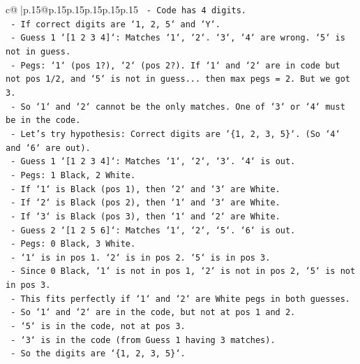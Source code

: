 \documentclass{article}
\begin{document}
{\begin{supertabular}{c@{$\;$}|p{.15\linewidth}@{}p{.15\linewidth}p{.15\linewidth}p{.15\linewidth}p{.15\linewidth}p{.15\linewidth}}
{{{\texttt{                    {-} Code has 4 digits.} \\
\texttt{                    {-} If correct digits are `1, 2, 5` and `Y`.} \\
\texttt{                    {-} Guess 1 `{[}1 2 3 4{]}`: Matches `1`, `2`. `3`, `4` are wrong. `5` is not in guess.} \\
\texttt{                    {-} Pegs: `1` (pos 1?), `2` (pos 2?). If `1` and `2` are in code but not pos 1/2, and `5` is not in guess... then max pegs = 2. But we got 3.} \\
\texttt{                    {-} So `1` and `2` cannot be the only matches. One of `3` or `4` must be in the code.} \\
\texttt{            {-} Let's try hypothesis: Correct digits are `\{1, 2, 3, 5\}`. (So `4` and `6` are out).} \\
\texttt{                {-} Guess 1 `{[}1 2 3 4{]}`: Matches `1`, `2`, `3`. `4` is out.} \\
\texttt{                    {-} Pegs: 1 Black, 2 White.} \\
\texttt{                    {-} If `1` is Black (pos 1), then `2` and `3` are White.} \\
\texttt{                    {-} If `2` is Black (pos 2), then `1` and `3` are White.} \\
\texttt{                    {-} If `3` is Black (pos 3), then `1` and `2` are White.} \\
\texttt{                {-} Guess 2 `{[}1 2 5 6{]}`: Matches `1`, `2`, `5`. `6` is out.} \\
\texttt{                    {-} Pegs: 0 Black, 3 White.} \\
\texttt{                    {-} `1` is in pos 1. `2` is in pos 2. `5` is in pos 3.} \\
\texttt{                    {-} Since 0 Black, `1` is not in pos 1, `2` is not in pos 2, `5` is not in pos 3.} \\
\texttt{                    {-} This fits perfectly if `1` and `2` are White pegs in both guesses.} \\
\texttt{                    {-} So `1` and `2` are in the code, but not at pos 1 and 2.} \\
\texttt{                    {-} `5` is in the code, not at pos 3.} \\
\texttt{                    {-} `3` is in the code (from Guess 1 having 3 matches).} \\
\texttt{                    {-} So the digits are `\{1, 2, 3, 5\}`.} \\
}}}
\end{supertabular}}
\end{document}
